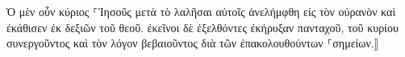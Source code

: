\documentclass{openreader}
\begin{document}
Ὁ μὲν οὖν κύριος ⸀Ἰησοῦς μετὰ τὸ λαλῆσαι αὐτοῖς ἀνελήμφθη εἰς τὸν οὐρανὸν καὶ ἐκάθισεν ἐκ δεξιῶν τοῦ θεοῦ. 
ἐκεῖνοι δὲ ἐξελθόντες ἐκήρυξαν πανταχοῦ, τοῦ κυρίου συνεργοῦντος καὶ τὸν λόγον βεβαιοῦντος διὰ τῶν ἐπακολουθούντων ⸀σημείων.⟧ 
\end{document}
